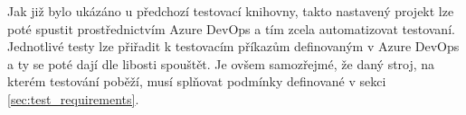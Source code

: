 Jak již bylo ukázáno u předchozí testovací knihovny\cite{bakalarka}, takto nastavený projekt lze poté spustit prostřednictvím Azure DevOps a tím zcela automatizovat testovaní. Jednotlivé testy lze přiřadit k testovacím příkazům definovaným v Azure DevOps a ty se poté dají dle libosti spouštět. Je ovšem samozřejmé, že daný stroj, na kterém testování poběží, musí splňovat podmínky definované v sekci \ref{sec:test_requirements}.

